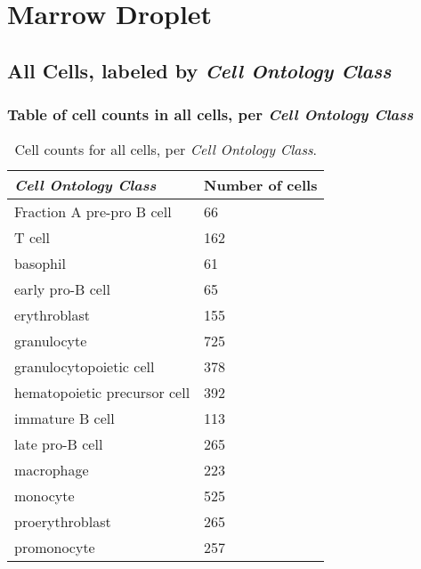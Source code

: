 \clearpage
\section{Marrow Droplet}

\subsection{All Cells, labeled by \emph{Cell Ontology Class}}
\subsubsection{Table of cell counts in all cells, per \emph{Cell Ontology Class}}\begin{table}[h]
\centering
\label{my-label}
\begin{tabular}{@{}ll@{}}
\toprule

\emph{Cell Ontology Class}& Number of cells \\ \midrule
Fraction A pre-pro B cell & 66 \\

T cell & 162 \\

basophil & 61 \\

early pro-B cell & 65 \\

erythroblast & 155 \\

granulocyte & 725 \\

granulocytopoietic cell & 378 \\

hematopoietic precursor cell & 392 \\

immature B cell & 113 \\

late pro-B cell & 265 \\

macrophage & 223 \\

monocyte & 525 \\

proerythroblast & 265 \\

promonocyte & 257 \\
\bottomrule
\end{tabular}
\caption{Cell counts for all cells, per \emph{Cell Ontology Class}.}
\end{table}

